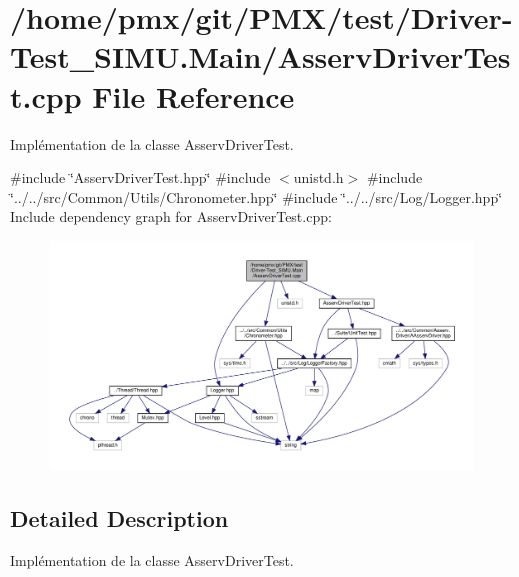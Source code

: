\hypertarget{Driver-Test__SIMU_8Main_2AsservDriverTest_8cpp}{}\section{/home/pmx/git/\+P\+M\+X/test/\+Driver-\/\+Test\+\_\+\+S\+I\+MU.Main/\+Asserv\+Driver\+Test.cpp File Reference}
\label{Driver-Test__SIMU_8Main_2AsservDriverTest_8cpp}


Implémentation de la classe Asserv\+Driver\+Test.  


{\ttfamily \#include \char`\"{}Asserv\+Driver\+Test.\+hpp\char`\"{}}\newline
{\ttfamily \#include $<$unistd.\+h$>$}\newline
{\ttfamily \#include \char`\"{}../../src/\+Common/\+Utils/\+Chronometer.\+hpp\char`\"{}}\newline
{\ttfamily \#include \char`\"{}../../src/\+Log/\+Logger.\+hpp\char`\"{}}\newline
Include dependency graph for Asserv\+Driver\+Test.\+cpp\+:
\nopagebreak
\begin{figure}[H]
\begin{center}
\leavevmode
\includegraphics[width=350pt]{Driver-Test__SIMU_8Main_2AsservDriverTest_8cpp__incl}
\end{center}
\end{figure}


\subsection{Detailed Description}
Implémentation de la classe Asserv\+Driver\+Test. 

